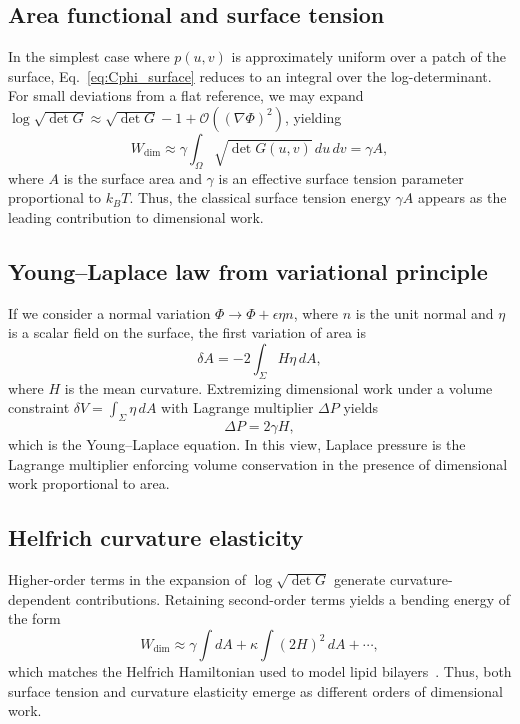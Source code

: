 \documentclass[aps,pre,twocolumn,superscriptaddress,floatfix]{revtex4-2}
\begin{document}
\subsection{Area functional and surface tension}

In the simplest case where $p(u,v)$ is approximately uniform over a patch of the surface, Eq.~\eqref{eq:Cphi_surface} reduces to an integral over the log-determinant. For small deviations from a flat reference, we may expand $\log\sqrt{\det G} \approx \sqrt{\det G} - 1 + \mathcal{O}((\nabla\Phi)^2)$, yielding
\begin{equation}
W_{\mathrm{dim}} \approx \gamma \int_\Omega \sqrt{\det G(u,v)}\,du\,dv = \gamma A,
\end{equation}
where $A$ is the surface area and $\gamma$ is an effective surface tension parameter proportional to $k_B T$. Thus, the classical surface tension energy $\gamma A$ appears as the leading contribution to dimensional work.

\subsection{Young--Laplace law from variational principle}

If we consider a normal variation $\Phi \to \Phi + \epsilon \eta n$, where $n$ is the unit normal and $\eta$ is a scalar field on the surface, the first variation of area is~\cite{docarmo1976}
\begin{equation}
\delta A = -2 \int_\Sigma H \eta\, dA,
\end{equation}
where $H$ is the mean curvature. Extremizing dimensional work under a volume constraint $\delta V = \int_\Sigma \eta\,dA$ with Lagrange multiplier $\Delta P$ yields
\begin{equation}
\Delta P = 2\gamma H,
\end{equation}
which is the Young--Laplace equation. In this view, Laplace pressure is the Lagrange multiplier enforcing volume conservation in the presence of dimensional work proportional to area.

\subsection{Helfrich curvature elasticity}

Higher-order terms in the expansion of $\log\sqrt{\det G}$ generate curvature-dependent contributions. Retaining second-order terms yields a bending energy of the form
\begin{equation}
W_{\mathrm{dim}} \approx \gamma \int dA + \kappa \int (2H)^2\,dA + \cdots,
\end{equation}
which matches the Helfrich Hamiltonian used to model lipid bilayers~\cite{helfrich1973}. Thus, both surface tension and curvature elasticity emerge as different orders of dimensional work.
\end{document}
